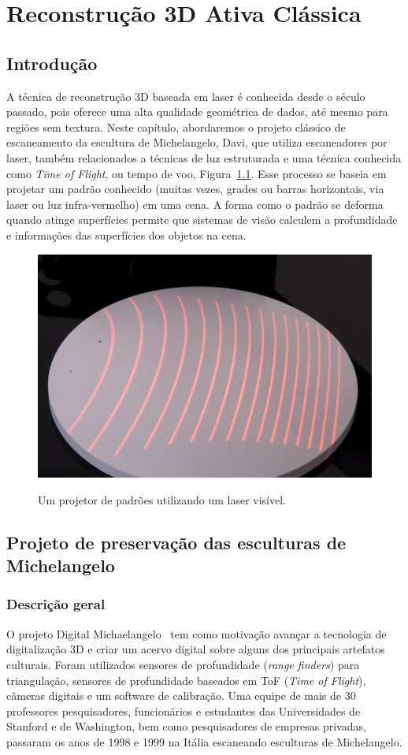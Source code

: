 \doublespacing
\chapter{Reconstrução 3D Ativa Clássica}\label{cap:laser}
\doublespacing
\section{Introdução}

A técnica de reconstrução 3D baseada em laser 
é conhecida desde o século
passado, pois oferece uma alta qualidade geométrica de dados, até mesmo para
regiões sem textura.  Neste capítulo, abordaremos o projeto clássico de escaneamento da
escultura de Michelangelo, Davi, que utiliza escaneadores 
por laser, também relacionados a técnicas de luz estruturada e
uma técnica conhecida como \emph{Time of Flight}, ou tempo de voo,
Figura~\ref{fig:luzestruturada}. Esse processo se baseia em projetar um padrão
conhecido (muitas vezes, grades ou barras horizontais, via laser ou luz infra-vermelho) em uma
cena. A forma como o padrão se deforma quando atinge superfícies permite que
sistemas de visão calculem a profundidade e informações das superfícies dos
objetos na cena.

\begin{figure}[!h]
	\centering
	\caption{%
		Um projetor de padrões utilizando um laser visível.
		}
	\includegraphics[width=0.4\linewidth]{figs/luzestruturada.jpg}
	\label{fig:luzestruturada}
\end{figure}


\section{Projeto de preservação das esculturas de Michelangelo}\label{sec:David}

\subsection{Descrição geral}

O projeto Digital Michaelangelo~\cite{levoy2000digital} tem como motivação
avançar a tecnologia de digitalização 3D e criar um acervo digital sobre alguns
dos principais artefatos culturais. Foram
utilizados sensores de profundidade (\emph{range finders}) para triangulação,
sensores de profundidade baseados em ToF (\emph{Time of Flight}), câmeras digitais e
um software de calibração. Uma equipe de mais de 30 professores pesquisadores,
funcionários e estudantes das Universidades de Stanford e de Washington, bem como pesquisadores de 
empresas privadas, passaram os anos de 1998 e
1999 na Itália escaneando esculturas de Michelangelo. 

